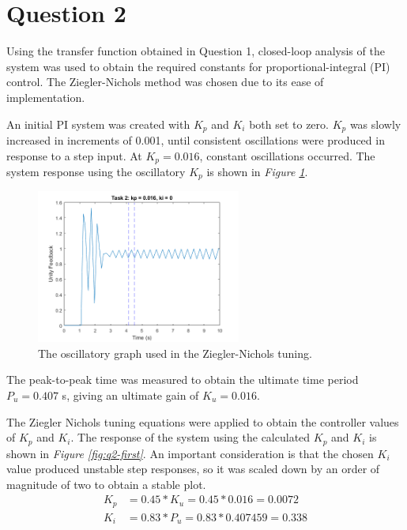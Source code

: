\documentclass[11pt, onecolumn]{article}
\begin{document}
\section*{Question 2}
\par Using the transfer function obtained in Question 1, closed-loop analysis of the system was used to obtain the required constants for proportional-integral (PI) control. The Ziegler-Nichols method was chosen due to its ease of implementation.
\par An initial PI system was created with $K_p$ and $K_i$ both set to zero. $K_p$ was slowly increased in increments of 0.001, until consistent oscillations were produced in response to a step input. At $K_p = 0.016$, constant oscillations occurred. The system response using the oscillatory $K_p$ is shown in \textit{Figure \ref{fig:q2-oscillatory}}.
\begin{figure}[h!]
    \centering
    \includegraphics[width=0.6\textwidth]{q2-g1.png}
    \caption{The oscillatory graph used in the Ziegler-Nichols tuning.}
    \label{fig:q2-oscillatory}
\end{figure}
\par The peak-to-peak time was measured to obtain the ultimate time period $P_u = 0.407$ s, giving an ultimate gain of $K_u = 0.016$.
\par The Ziegler Nichols tuning equations were applied to obtain the controller values of $K_p$ and $K_i$. The response of the system using the calculated $K_p$ and $K_i$ is shown in \textit{Figure \ref{fig:q2-first}}. An important consideration is that the chosen $K_i$ value produced unstable step responses, so it was scaled down by an order of magnitude of two to obtain a stable plot.
\begin{align*}
    K_p & = 0.45 * K_u = 0.45 * 0.016 = 0.0072   \\
    K_i & = 0.83 * P_u = 0.83 * 0.407459 = 0.338
\end{align*}
\end{document}
